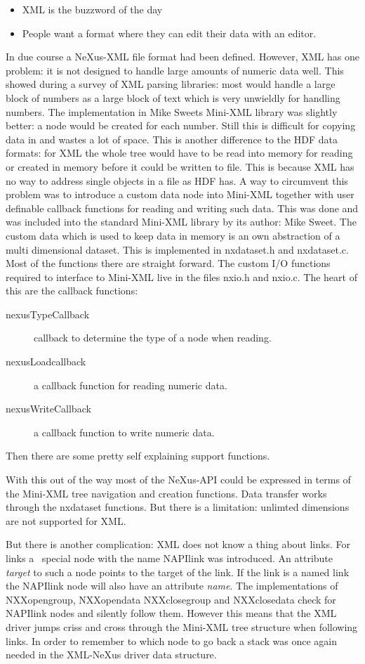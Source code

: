 \documentclass[a4paper]{article}
\begin{document}
\begin{itemize}\item XML is the buzzword of the day
\item People want a format where they can edit their data with an editor.
\end{itemize}In due course a NeXus-XML file format had been defined. However, XML has one problem: 
it is not designed to handle large amounts of numeric data well. This showed during a survey 
of XML parsing libraries: most would handle a large block of numbers as a large block
of text which is very unwieldly for handling numbers. The implementation in Mike Sweets 
Mini-XML library was slightly better: a node would be created for each number. Still this 
is difficult for copying data in and wastes a lot of space. This is another difference to 
the HDF data formats: for XML the whole tree would have to be read into memory for reading 
 or created in memory before it could be written to file. This is because XML has no way 
to address single objects in a file as HDF has. A way to circumvent this problem was to 
introduce a custom data node into Mini-XML together with user definable callback functions 
for reading and writing such data. This was done and was included into the standard 
Mini-XML library by its author: Mike Sweet. The custom data which is used to keep data in 
memory is an own abstraction of a multi dimensional dataset. This is implemented in 
nxdataset.h and nxdataset.c. Most of the functions there are straight forward. The custom 
I/O functions required to interface to Mini-XML live in the files nxio.h and nxio.c. The 
heart of this are the callback functions:


\begin{description}\item[nexusTypeCallback
]  callback to determine the type of a node when reading.
\item[nexusLoadcallback
]  a callback function for reading numeric data.
\item[nexusWriteCallback
]  a callback function to write numeric data. 
\end{description}Then there are some pretty self explaining support functions.


With this out of the way most of the NeXus-API could be expressed in terms of the Mini-XML 
tree navigation and creation functions. Data transfer works through the nxdataset functions.
But there is a limitation: unlimted dimensions are not supported for XML. 


But there is another complication: XML does not know a thing about links. For links a \
special node with the name NAPIlink was introduced. 
An attribute {\it  target} to such a node points to the target of the link. If the link is a named link 
the NAPIlink node will also have an attribute {\it  name}. The 
implementations of NXXopengroup, NXXopendata NXXclosegroup and NXXclosedata check for NAPIlink 
nodes and silently follow them. However this means that the XML driver jumps criss and cross 
through the Mini-XML tree structure when following links. In order to remember to which node to 
go back a stack was once again needed in the XML-NeXus driver data structure.
\end{document}
